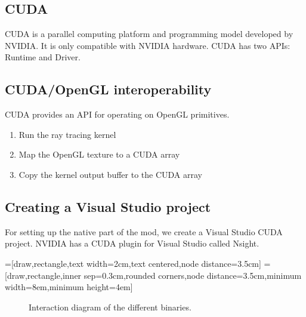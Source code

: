 \documentclass[]{article}
\begin{document}
\subsection{CUDA}
CUDA is a parallel computing platform and programming model developed by NVIDIA.
It is only compatible with NVIDIA hardware.
CUDA has two APIs: Runtime and Driver.
\subsection{CUDA/OpenGL interoperability}
CUDA provides an API for operating on OpenGL primitives.
\begin{enumerate}
  \item Run the ray tracing kernel
  \item Map the OpenGL texture to a CUDA array
  \item Copy the kernel output buffer to the CUDA array
\end{enumerate}

\subsection{Creating a Visual Studio project}
For setting up the native part of the mod, we create a Visual Studio CUDA project.
NVIDIA has a CUDA plugin for Visual Studio called Nsight.

=[draw,rectangle,text width=2cm,text centered,node distance=3.5cm]
=[draw,rectangle,inner sep=0.3cm,rounded corners,node distance=3.5cm,minimum width=8em,minimum height=4em]
\begin{figure}
  \centering
  \caption[Binary interaction]{Interaction diagram of the different binaries.}
  \label{fig:modules}
\end{figure}
\end{document}
